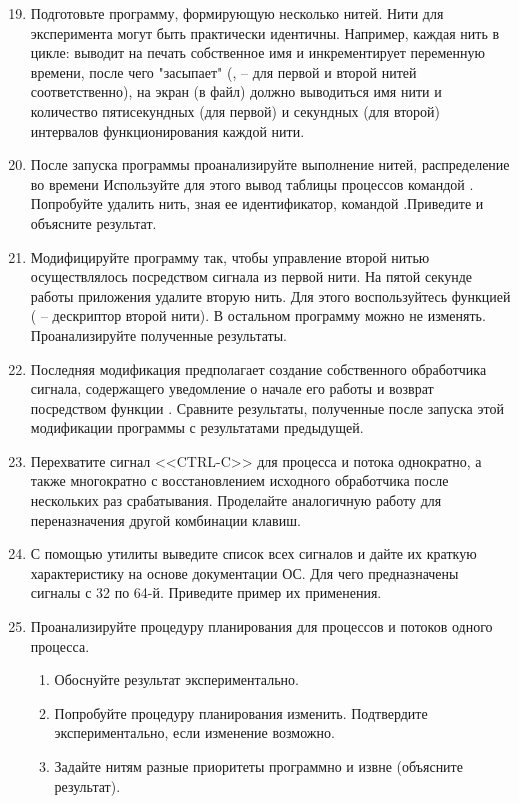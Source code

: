 \begin{enumerate}
	\setcounter{enumi}{18}
	\item Подготовьте программу, формирующую несколько нитей. Нити для эксперимента могут быть практически идентичны. Например, каждая нить в цикле: выводит на печать собственное имя и инкрементирует переменную времени, после чего "засыпает" (,  -- для первой и второй нитей соответственно), на экран (в файл) должно выводиться имя нити и количество пятисекундных (для первой) и секундных (для второй) интервалов функционирования каждой нити.
	\item После запуска программы проанализируйте выполнение нитей, распределение во времени Используйте для этого вывод таблицы процессов командой . Попробуйте удалить нить, зная ее идентификатор, командой .Приведите и объясните результат.
	\item Модифицируйте программу так, чтобы управление второй нитью осуществлялось посредством сигнала  из первой нити. На пятой секунде работы приложения удалите вторую нить. Для этого воспользуйтесь функцией  ( -- дескриптор второй нити). В остальном программу можно не изменять. Проанализируйте полученные
	результаты.
	\item Последняя модификация предполагает создание собственного обработчика сигнала, содержащего уведомление о начале его работы и возврат посредством функции . Сравните результаты, полученные после запуска этой модификации программы с результатами предыдущей.
	\item Перехватите сигнал <<CTRL-C>> для процесса и потока однократно, а также многократно с восстановлением исходного обработчика после нескольких раз срабатывания. Проделайте аналогичную работу для переназначения другой комбинации клавиш.
	\item С помощью утилиты  выведите список всех сигналов и дайте их краткую характеристику на основе документации ОС. Для чего предназначены сигналы с 32 по 64-й. Приведите пример их применения.
	\item Проанализируйте процедуру планирования для процессов и потоков одного процесса. 
		\begin{enumerate}
			\item Обоснуйте результат экспериментально.
			\item Попробуйте процедуру планирования изменить. Подтвердите экспериментально, если изменение возможно.
			\item Задайте нитям разные приоритеты программно и извне (объясните результат). 
		\end{enumerate}
\end{enumerate}